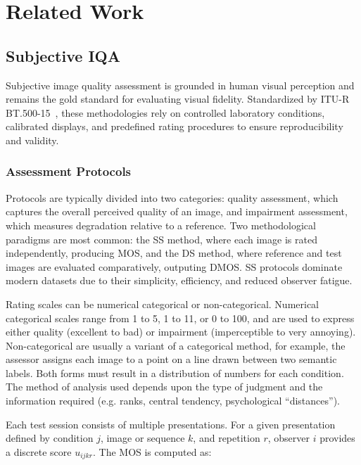 \chapter{Related Work}\label{chap:related_work}

\section{Subjective \acl{IQA}}\label{sec:subjective_iqa}

Subjective image quality assessment is grounded in human visual perception and remains the gold standard for evaluating visual fidelity. Standardized by \acs{ITU-R BT.500-15}~\cite{itu2023r}, these methodologies rely on controlled laboratory conditions, calibrated displays, and predefined rating procedures to ensure reproducibility and validity.

\subsection{Assessment Protocols}\label{sec:assessment_protocols}

Protocols are typically divided into two categories: quality assessment, which captures the overall perceived quality of an image, and impairment assessment, which measures degradation relative to a reference. Two methodological paradigms are most common: the \acf{SS} method, where each image is rated independently, producing \acf{MOS}, and the \acf{DS} method, where reference and test images are evaluated comparatively, outputing \acf{DMOS}. \acs{SS} protocols dominate modern datasets due to their simplicity, efficiency, and reduced observer fatigue.

Rating scales can be numerical categorical or non-categorical. Numerical categorical scales range from 1 to 5, 1 to 11, or 0 to 100, and are used to express either quality (excellent to bad) or impairment (imperceptible to very annoying). Non-categorical are usually a variant of a categorical method, for example, the assessor assigns each image to a point on a line drawn between two semantic labels. Both forms must result in a distribution of numbers for each condition. The method of analysis used depends upon the type of judgment and the information required (e.g. ranks, central tendency, psychological ``distances'').

Each test session consists of multiple presentations. For a given presentation defined by condition $j$, image or sequence $k$, and repetition $r$, observer $i$ provides a discrete score $u_{ijkr}$. The \acs{MOS} is computed as:

